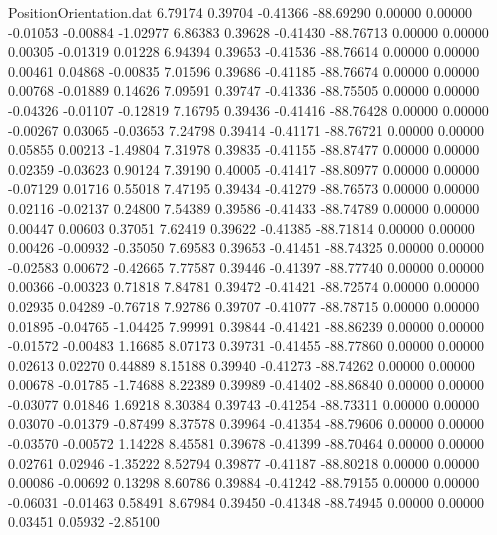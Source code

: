 \begin{filecontents}{PositionOrientation.dat}
   6.79174    0.39704   -0.41366   -88.69290    0.00000    0.00000   -0.01053   -0.00884   -1.02977
   6.86383    0.39628   -0.41430   -88.76713    0.00000    0.00000    0.00305   -0.01319    0.01228
   6.94394    0.39653   -0.41536   -88.76614    0.00000    0.00000    0.00461    0.04868   -0.00835
   7.01596    0.39686   -0.41185   -88.76674    0.00000    0.00000    0.00768   -0.01889    0.14626
   7.09591    0.39747   -0.41336   -88.75505    0.00000    0.00000   -0.04326   -0.01107   -0.12819
   7.16795    0.39436   -0.41416   -88.76428    0.00000    0.00000   -0.00267    0.03065   -0.03653
   7.24798    0.39414   -0.41171   -88.76721    0.00000    0.00000    0.05855    0.00213   -1.49804
   7.31978    0.39835   -0.41155   -88.87477    0.00000    0.00000    0.02359   -0.03623    0.90124
   7.39190    0.40005   -0.41417   -88.80977    0.00000    0.00000   -0.07129    0.01716    0.55018
   7.47195    0.39434   -0.41279   -88.76573    0.00000    0.00000    0.02116   -0.02137    0.24800
   7.54389    0.39586   -0.41433   -88.74789    0.00000    0.00000    0.00447    0.00603    0.37051
   7.62419    0.39622   -0.41385   -88.71814    0.00000    0.00000    0.00426   -0.00932   -0.35050
   7.69583    0.39653   -0.41451   -88.74325    0.00000    0.00000   -0.02583    0.00672   -0.42665
   7.77587    0.39446   -0.41397   -88.77740    0.00000    0.00000    0.00366   -0.00323    0.71818
   7.84781    0.39472   -0.41421   -88.72574    0.00000    0.00000    0.02935    0.04289   -0.76718
   7.92786    0.39707   -0.41077   -88.78715    0.00000    0.00000    0.01895   -0.04765   -1.04425
   7.99991    0.39844   -0.41421   -88.86239    0.00000    0.00000   -0.01572   -0.00483    1.16685
   8.07173    0.39731   -0.41455   -88.77860    0.00000    0.00000    0.02613    0.02270    0.44889
   8.15188    0.39940   -0.41273   -88.74262    0.00000    0.00000    0.00678   -0.01785   -1.74688
   8.22389    0.39989   -0.41402   -88.86840    0.00000    0.00000   -0.03077    0.01846    1.69218
   8.30384    0.39743   -0.41254   -88.73311    0.00000    0.00000    0.03070   -0.01379   -0.87499
   8.37578    0.39964   -0.41354   -88.79606    0.00000    0.00000   -0.03570   -0.00572    1.14228
   8.45581    0.39678   -0.41399   -88.70464    0.00000    0.00000    0.02761    0.02946   -1.35222
   8.52794    0.39877   -0.41187   -88.80218    0.00000    0.00000    0.00086   -0.00692    0.13298
   8.60786    0.39884   -0.41242   -88.79155    0.00000    0.00000   -0.06031   -0.01463    0.58491
   8.67984    0.39450   -0.41348   -88.74945    0.00000    0.00000    0.03451    0.05932   -2.85100

\end{filecontents}
